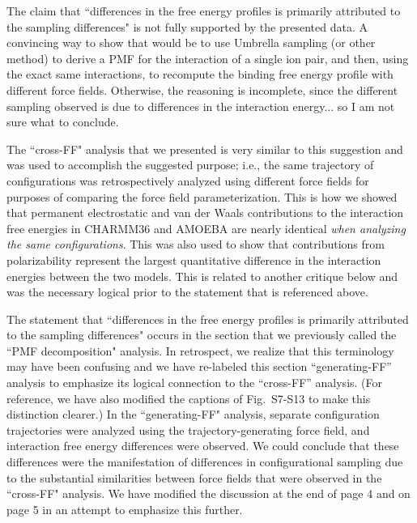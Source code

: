 \documentclass[answers,12pt]{exam}
\begin{document}
\begin{questions}
\begin{solution}
    \end{solution}
 
    \question The claim that ``differences in the free energy profiles is primarily attributed to the sampling differences" is not fully supported by the presented data. A convincing way to show that would be to use Umbrella sampling (or other method) to derive a PMF for the interaction of a single ion pair, and then, using the exact same interactions, to recompute the binding free energy profile with different force fields. Otherwise, the reasoning is incomplete, since the different sampling observed is due to differences in the interaction energy... so I am not sure what to conclude.
    \begin{solution}
    The ``cross-FF" analysis that we presented is very similar to this suggestion and was used to accomplish the suggested purpose; i.e., the same trajectory of configurations was retrospectively analyzed using different force fields for purposes of comparing the force field parameterization. This is how we showed that permanent electrostatic and van der Waals contributions to the interaction free energies in CHARMM36 and AMOEBA are nearly identical \textit{when analyzing the same configurations}. This was also used to show that contributions from polarizability represent the largest quantitative difference in the interaction energies between the two models. This is related to another critique below and was the necessary logical prior to the statement that is referenced above.
    
    The statement that ``differences in the free energy profiles is primarily attributed to the sampling differences" occurs in the section that we previously called the ``PMF decomposition" analysis. In retrospect, we realize that this terminology may have been confusing and we have re-labeled this section “generating-FF” analysis to emphasize its logical connection to the “cross-FF” analysis. (For reference, we have also modified the captions of Fig.~S7-S13 to make this distinction clearer.) In the ``generating-FF" analysis, separate configuration trajectories were analyzed using the trajectory-generating force field, and interaction free energy differences were observed. We could conclude that these differences were the manifestation of differences in configurational sampling due to the substantial similarities between force fields that were observed in the ``cross-FF" analysis. We have modified the discussion at the end of page 4 and on page 5 in an attempt to emphasize this further.


\end{solution}
\end{questions}
\end{document}
